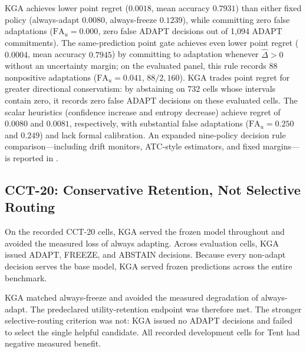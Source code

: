KGA achieves lower point regret ($0.0018$, mean accuracy $0.7931$) than either fixed policy
(always-adapt $0.0080$, always-freeze $0.1239$), while committing zero false adaptations
($\mathrm{FA}_u = 0.000$, zero false ADAPT decisions out of 1{,}094 ADAPT commitments).
The same-prediction point gate achieves even lower point regret ($0.0004$, mean accuracy $0.7945$)
by committing to adaptation whenever $\widehat\Delta > 0$ without an uncertainty margin;
on the evaluated panel, this rule records 88 nonpositive adaptations ($\mathrm{FA}_u = 0.041$,
$88/2{,}160$). KGA trades point regret for greater directional conservatism: by abstaining on 732 cells whose intervals contain zero, it records zero false ADAPT decisions on these evaluated cells.
The scalar heuristics (confidence increase and entropy decrease) achieve regret of $0.0080$ and $0.0081$,
respectively, with substantial false adaptations ($\mathrm{FA}_u = 0.250$ and $0.249$) and lack formal calibration.
An expanded nine-policy decision rule comparison—including drift monitors, ATC-style estimators, and fixed margins—is reported in .

\subsection{CCT-20: Conservative Retention, Not Selective Routing}
\label{sec:cct20-result}

On the recorded CCT-20 cells, KGA served the frozen model throughout and avoided the measured loss of always adapting.
Across \CCTCellCount{} evaluation cells, KGA issued \CCTAdaptCount{} ADAPT, \CCTFreezeCount{} FREEZE,
and \CCTAbstainCount{} ABSTAIN decisions. Because every non-adapt decision serves the base
model, KGA served frozen predictions across the entire benchmark.

\begin{table}[t]
\centering
\footnotesize
\caption{CCT-20 utility-retention endpoint defined in Eq.~\eqref{eq:cct-safe-utility}.
Contrasts are baseline regret minus KGA regret on the set-membership accuracy-proportion scale.
Contrasts report nominal pointwise 95\% two-way bootstrap intervals.
Location-level records are detailed in the supplement.}
\label{tab:cct20-safe-utility}

\end{table}

KGA matched always-freeze and avoided the measured degradation of always-adapt. The predeclared utility-retention endpoint was therefore met. The stronger selective-routing criterion was not: KGA issued no ADAPT decisions and failed to select the single helpful candidate.
All recorded development cells for Tent had negative measured benefit.

